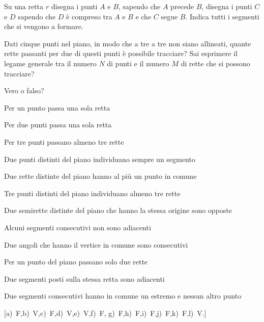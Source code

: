 \begin{esercizio}
\label{ese:1.47}
Su una retta $r$ disegna i punti $A$ e $B$, sapendo che $A$ precede 
$B$, disegna i punti $C$ e $D$ sapendo che $D$ è compreso tra $A$ e 
$B$ e che $C$ segue $B$. Indica tutti i segmenti che si vengono a 
formare.
\end{esercizio}

\begin{esercizio}
\label{ese:1.48}
Dati cinque punti nel piano, in modo che a tre a tre non siano 
allineati, quante rette passanti per due di questi punti è possibile 
tracciare? Sai esprimere il legame generale tra il numero $N$ di 
punti e il numero $M$ di rette che si possono tracciare?
\end{esercizio}

\begin{esercizio}
\label{ese:1.49}
Vero o falso?
\begin{enumeratea}
\item Per un punto passa una sola retta		\hfill\boxV\quad\boxF
\item Per due punti passa una sola retta		
\hfill\boxV\quad\boxF
\item Per tre punti passano almeno tre rette	\hfill\boxV\quad\boxF
\item Due punti distinti del piano individuano sempre un 
segmento	\hfill\boxV\quad\boxF
\item Due rette distinte del piano hanno al più un punto in 
comune	\hfill\boxV\quad\boxF
\item Tre punti distinti del piano individuano almeno tre rette	
\hfill\boxV\quad\boxF
\item Due semirette distinte del piano che hanno la stessa origine 
sono opposte	\hfill\boxV\quad\boxF
\item Alcuni segmenti consecutivi non sono adiacenti		
\hfill\boxV\quad\boxF
\item Due angoli che hanno il vertice in comune sono 
consecutivi		\hfill\boxV\quad\boxF
\item Per un punto del piano passano solo due rette		
\hfill\boxV\quad\boxF
\item Due segmenti posti sulla stessa retta sono adiacenti	
\hfill\boxV\quad\boxF
\item Due segmenti consecutivi hanno in comune un estremo e nessun 
altro punto		\hfill\boxV\quad\boxF
\end{enumeratea}
 \hfill[a)~F,\quad b)~V,\quad c)~F,\quad d)~V,\quad e)~V,\quad f)~F,\quad 
g)~F,\quad h)~F,\quad i)~F,\quad j)~F,\quad k)~F,\quad l)~V.]
\end{esercizio}

